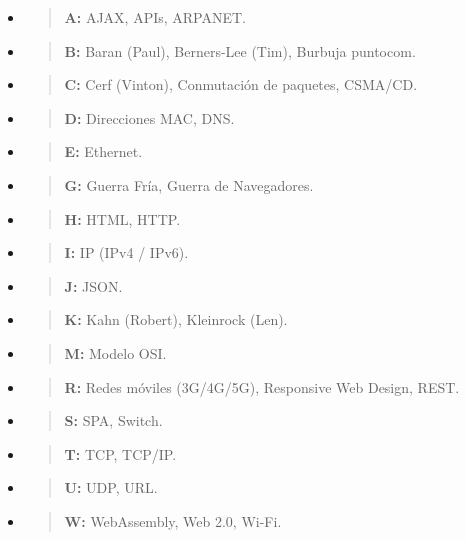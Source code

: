 \begin{itemize}
\item
  \begin{quote}
  \textbf{A:} AJAX, APIs, ARPANET.
  \end{quote}
\item
  \begin{quote}
  \textbf{B:} Baran (Paul), Berners-Lee (Tim), Burbuja puntocom.
  \end{quote}
\item
  \begin{quote}
  \textbf{C:} Cerf (Vinton), Conmutación de paquetes, CSMA/CD.
  \end{quote}
\item
  \begin{quote}
  \textbf{D:} Direcciones MAC, DNS.
  \end{quote}
\item
  \begin{quote}
  \textbf{E:} Ethernet.
  \end{quote}
\item
  \begin{quote}
  \textbf{G:} Guerra Fría, Guerra de Navegadores.
  \end{quote}
\item
  \begin{quote}
  \textbf{H:} HTML, HTTP.
  \end{quote}
\item
  \begin{quote}
  \textbf{I:} IP (IPv4 / IPv6).
  \end{quote}
\item
  \begin{quote}
  \textbf{J:} JSON.
  \end{quote}
\item
  \begin{quote}
  \textbf{K:} Kahn (Robert), Kleinrock (Len).
  \end{quote}
\item
  \begin{quote}
  \textbf{M:} Modelo OSI.
  \end{quote}
\item
  \begin{quote}
  \textbf{R:} Redes móviles (3G/4G/5G), Responsive Web Design, REST.
  \end{quote}
\item
  \begin{quote}
  \textbf{S:} SPA, Switch.
  \end{quote}
\item
  \begin{quote}
  \textbf{T:} TCP, TCP/IP.
  \end{quote}
\item
  \begin{quote}
  \textbf{U:} UDP, URL.
  \end{quote}
\item
  \begin{quote}
  \textbf{W:} WebAssembly, Web 2.0, Wi-Fi.
  \end{quote}
\end{itemize}
